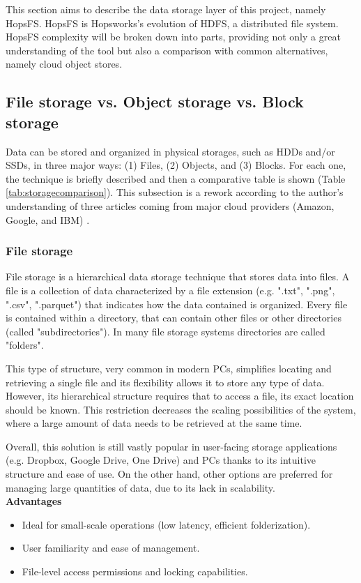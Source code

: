 This section aims to describe the data storage layer of this project, namely \gls{HopsFS}. \gls{HopsFS} is Hopsworks's evolution of \gls{HDFS}, a distributed file system. \gls{HopsFS} complexity will be broken down into parts, providing not only a great understanding of the tool but also a comparison with common alternatives, namely cloud object stores.

\subsection{File storage vs. Object storage vs. Block storage}
\label{subsec:file_vs_obj_vs_block}

Data can be stored and organized in physical storages, such as \glspl{HDD} and/or \glspl{SSD}, in three major ways: (1) Files, (2) Objects, and (3) Blocks. For each one, the technique is briefly described and then a comparative table is shown (Table \ref{tab:storagecomparison}). This subsection is a rework according to the author's understanding of three articles coming from major cloud providers (Amazon, Google, and IBM) \cite{BlockVsFile, HowObjectVs, ObjectVsFile2021}.

\subsubsection*{File storage}

File storage is a hierarchical data storage technique that stores data into files. A file is a collection of data characterized by a file extension (e.g. ".txt", ".png", ".csv", ".parquet") that indicates how the data contained is organized. Every file is contained within a directory, that can contain other files or other directories (called "subdirectories"). In many file storage systems directories are called "folders". 

This type of structure, very common in modern \glspl{PC}, simplifies locating and retrieving a single file and its flexibility allows it to store any type of data. However, its hierarchical structure requires that to access a file, its exact location should be known. This restriction decreases the scaling possibilities of the system, where a large amount of data needs to be retrieved at the same time.

Overall, this solution is still vastly popular in user-facing storage applications (e.g. Dropbox, Google Drive, One Drive) and \glspl{PC} thanks to its intuitive structure and ease of use. On the other hand, other options are preferred for managing large quantities of data, due to its lack in scalability. \\[3mm]
\noindent\textbf{Advantages}
\begin{itemize}
    \item Ideal for small-scale operations (low latency, efficient folderization).
    \item User familiarity and ease of management.
    \item File-level access permissions and locking capabilities.
\end{itemize}

